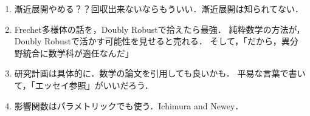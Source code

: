 \documentclass[uplatex, dvipdfmx]{jsarticle}
\begin{document}
\begin{enumerate}
    \item 漸近展開やめる？？回収出来ないならもういい．漸近展開は知られてない．
    \item Frechet多様体の話を，Doubly Robustで拾えたら最強．
    純粋数学の方法が，Doubly Robustで活かす可能性を見せると売れる．
    そして，「だから，異分野統合に数学科が適任なんだ」
    \item 研究計画は具体的に．数学の論文を引用しても良いかも．
    平易な言葉で書いて，「エッセイ参照」がいいだろう．
    \item 影響関数はパラメトリックでも使う．Ichimura and Newey．
\end{enumerate}
\end{document}
